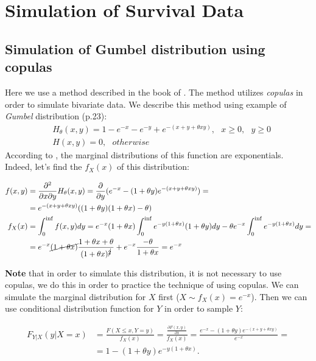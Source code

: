 \documentclass[]{article}
\begin{document}
\section{Simulation of Survival Data}
\subsection{Simulation of Gumbel distribution using copulas}
Here we use a method described in the book of \cite{nelsen2007introduction}. The method utilizes \emph{copulas} in order to simulate bivariate data. We describe this method using example of \emph{Gumbel} distribution (p.23):
	$$
	\begin{aligned}
    &H_{\theta}(x, y) = 1-e^{-x} - e^{-y} + e^{-(x+y+\theta xy)}, ~~~ x\geq 0, ~~~y\geq 0\\
    &H(x,y) = 0, ~~~otherwise
	\end{aligned}
	$$
According to \cite{nelsen2007introduction}, the marginal distributions of this function are exponentials. Indeed, let's find the $f_X(x)$ of this distribution:

$$
\begin{aligned}
    f(x,y) & = \frac{\partial^2}{\partial x \partial y}H_{\theta}(x, y) = \frac{\partial}{\partial y}(e^{-x} - (1+\theta y)e^{-(x+y+\theta xy)}) =\\
      & = e^{-(x+y+\theta xy)}((1+\theta y)(1+\theta x) - \theta)\\
    f_X(x) & = \int_0^{\inf} f(x,y)dy = e^{-x}(1 + \theta x)\int_0^{\inf}e^{-y(1+\theta x)} (1 + \theta y) dy  - \theta e^{-x} \int_0^{\inf} e^{-y(1+\theta x)} dy = \\
    & = e^{-x}\cancel{(1 + \theta x)} \frac{1+\theta x + \theta}{(1+\theta x)^{\cancel{2}}} + e^{-x}\frac{-\theta}{1 + \theta x} = e^{-x}
\end{aligned}
$$

\textbf{Note} that in order to simulate this distribution, it is not necessary to use copulas, we do this in order to practice the technique of using copulas. We can simulate the marginal distribution for $X$ first ($X \sim f_X(x) = e^{-x}$). Then we can use conditional distribution function for $Y$ in order to sample $Y$: 


$$
\begin{aligned}
F_{Y|X}(y|X=x) &= \frac{F(X\leq x,Y=y)}{f_X(x)}= \frac{\frac{\partial F(x,y)}{\partial x}}{f_X(x)} =\frac{ e^{-x} - (1+\theta y)e^{-(x+y+\theta xy)}}{e^{-x}} =\\
&= 1 - (1+\theta y)e^{-y(1+\theta x)}.
\end{aligned}
$$
\end{document}
